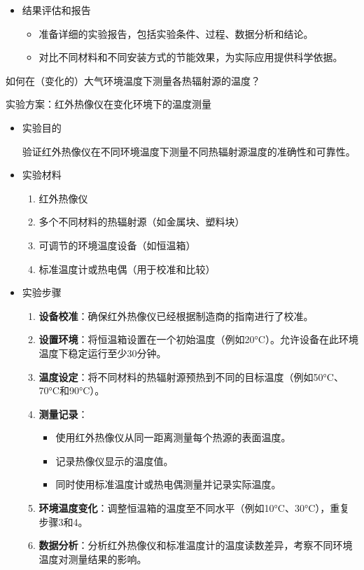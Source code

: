 \documentclass[dvipsnames, svgnames,a4paper,11pt]{article}
\begin{document}
\begin{itemize}
		\item 结果评估和报告
		\begin{itemize}
			\item 准备详细的实验报告，包括实验条件、过程、数据分析和结论。
			\item 对比不同材料和不同安装方式的节能效果，为实际应用提供科学依据。
		\end{itemize}
		
	\end{itemize}
	
	
	\begin{question}
		如何在（变化的）大气环境温度下测量各热辐射源的温度？
	\end{question}
	实验方案：红外热像仪在变化环境下的温度测量
	\begin{itemize}
		\item 实验目的
		
		验证红外热像仪在不同环境温度下测量不同热辐射源温度的准确性和可靠性。
		
		\item 实验材料
		\begin{enumerate}
			\item 红外热像仪
			\item 多个不同材料的热辐射源（如金属块、塑料块）
			\item 可调节的环境温度设备（如恒温箱）
			\item 标准温度计或热电偶（用于校准和比较）
		\end{enumerate}
		
		\item 实验步骤
		\begin{enumerate}
			\item \textbf{设备校准}：确保红外热像仪已经根据制造商的指南进行了校准。
			\item \textbf{设置环境}：将恒温箱设置在一个初始温度（例如20°C）。允许设备在此环境温度下稳定运行至少30分钟。
			\item \textbf{温度设定}：将不同材料的热辐射源预热到不同的目标温度（例如50°C、70°C和90°C）。
			\item \textbf{测量记录}：
			\begin{itemize}
				\item 使用红外热像仪从同一距离测量每个热源的表面温度。
				\item 记录热像仪显示的温度值。
				\item 同时使用标准温度计或热电偶测量并记录实际温度。
			\end{itemize}
			\item \textbf{环境温度变化}：调整恒温箱的温度至不同水平（例如10°C、30°C），重复步骤3和4。
			\item \textbf{数据分析}：分析红外热像仪和标准温度计的温度读数差异，考察不同环境温度对测量结果的影响。
		\end{enumerate}
		

\end{itemize}
\end{document}

